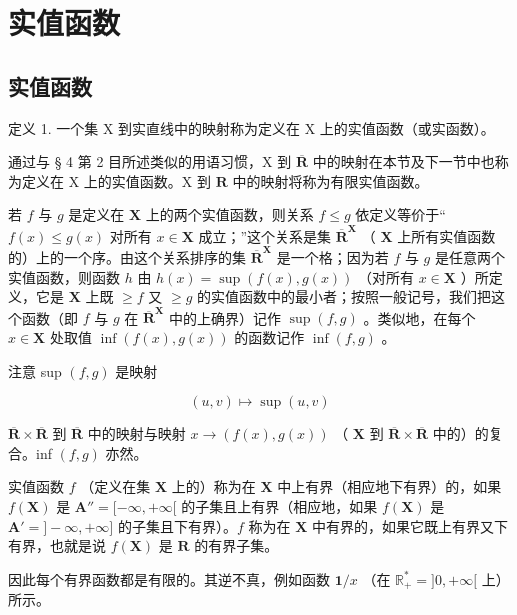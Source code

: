 \section{实值函数}

\subsection{实值函数}

定义 1. 一个集 X 到实直线中的映射称为定义在 X 上的实值函数（或实函数）。

通过与 § 4 第 2 目所述类似的用语习惯，X 到 \(\overline{\mathbf{R}}\) 中的映射在本节及下一节中也称为定义在 X 上的实值函数。X 到 \(\mathbf{R}\) 中的映射将称为有限实值函数。

若 \(f\) 与 \(g\) 是定义在 \(\mathbf{X}\) 上的两个实值函数，则关系 \(f \leqslant g\) 依定义等价于“\(f(x) \leqslant g(x)\) 对所有 \(x \in \mathbf{X}\) 成立；”这个关系是集 \(\overline{\mathbf{R}}^{\mathbf{X}}\) （ \(\mathbf{X}\) 上所有实值函数的）上的一个序。由这个关系排序的集 \(\overline{\mathbf{R}}^{\mathbf{X}}\) 是一个格；因为若 \(f\) 与 \(g\) 是任意两个实值函数，则函数 \(h\) 由 \(h(x) = \sup (f(x), g(x))\) （对所有 \(x \in \mathbf{X}\) ）所定义，它是 \(\mathbf{X}\) 上既 \(\geqslant f\) 又 \(\geqslant g\) 的实值函数中的最小者；按照一般记号，我们把这个函数（即 \(f\) 与 \(g\) 在 \(\overline{\mathbf{R}}^{\mathbf{X}}\) 中的上确界）记作 \(\sup (f, g)\) 。类似地，在每个 \(x \in \mathbf{X}\) 处取值 \(\inf (f(x), g(x))\) 的函数记作 \(\inf (f, g)\) 。

注意 sup \((f, g)\) 是映射

\[
(u, v) \mapsto \sup (u, v)
\]

\(\overline{\mathbf{R}}\times \overline{\mathbf{R}}\) 到 \(\overline{\mathbf{R}}\) 中的映射与映射 \(x\to (f(x),g(x))\) （ \(\mathbf{X}\) 到 \(\overline{\mathbf{R}}\times \overline{\mathbf{R}}\) 中的）的复合。inf \((f,g)\) 亦然。

实值函数 \(f\) （定义在集 \(\mathbf{X}\) 上的）称为在 \(\mathbf{X}\) 中上有界（相应地下有界）的，如果 \(f(\mathbf{X})\) 是 \(\mathbf{A}'' = [-\infty, +\infty[\) 的子集且上有界（相应地，如果 \(f(\mathbf{X})\) 是 \(\mathbf{A}' = ] - \infty, +\infty]\) 的子集且下有界）。\(f\) 称为在 \(\mathbf{X}\) 中有界的，如果它既上有界又下有界，也就是说 \(f(\mathbf{X})\) 是 \(\mathbf{R}\) 的有界子集。

因此每个有界函数都是有限的。其逆不真，例如函数 \(\mathbf{1} / x\) （在 \(\mathbb{R}_+^* = ]0, +\infty[\) 上）所示。
